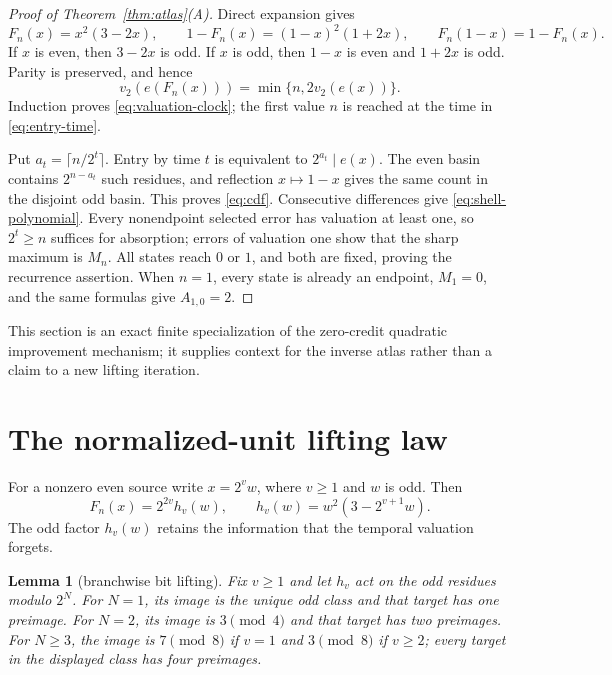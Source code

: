 \documentclass[a4paper,10pt]{amsart}
\newtheorem{lemma}[theorem]{Lemma}
\theoremstyle{remark}
\newcommand{\vtwo}{v_2}
\begin{document}
\begin{proof}[Proof of Theorem~\ref{thm:atlas}(A)]
Direct expansion gives
\begin{equation}\label{eq:factorizations}
 F_n(x)=x^2(3-2x),\qquad
 1-F_n(x)=(1-x)^2(1+2x),\qquad
 F_n(1-x)=1-F_n(x).
\end{equation}
If $x$ is even, then $3-2x$ is odd.  If $x$ is odd, then $1-x$ is even
and $1+2x$ is odd.  Parity is preserved, and hence
\[
 \vtwo(e(F_n(x)))=\min\{n,2\vtwo(e(x))\}.
\]
Induction proves \eqref{eq:valuation-clock}; the first value $n$ is reached
at the time in \eqref{eq:entry-time}.

Put $a_t=\lceil n/2^t\rceil$.  Entry by time $t$ is equivalent to
$2^{a_t}\mid e(x)$.  The even basin contains $2^{n-a_t}$ such residues,
and reflection $x\mapsto1-x$ gives the same count in the disjoint odd basin.
This proves \eqref{eq:cdf}.  Consecutive differences give
\eqref{eq:shell-polynomial}.  Every nonendpoint selected error has valuation
at least one, so $2^t\geq n$ suffices for absorption; errors of valuation one
show that the sharp maximum is $M_n$.  All states reach $0$ or $1$, and both
are fixed, proving the recurrence assertion.  When $n=1$, every state is
already an endpoint, $M_1=0$, and the same formulas give $A_{1,0}=2$.
\end{proof}

This section is an exact finite specialization of the zero-credit quadratic
improvement mechanism; it supplies context for the inverse atlas rather than
a claim to a new lifting iteration.

\section{The normalized-unit lifting law}\label{sec:lifting}

For a nonzero even source write $x=2^v w$, where $v\geq1$ and $w$ is odd.
Then
\begin{equation}\label{eq:hv-factor}
 F_n(x)=2^{2v}h_v(w),\qquad
 h_v(w)=w^2(3-2^{v+1}w).
\end{equation}
The odd factor $h_v(w)$ retains the information that the temporal valuation
forgets.

\begin{lemma}[branchwise bit lifting]\label{lem:unit}
Fix $v\geq1$ and let $h_v$ act on the odd residues modulo $2^N$.
For $N=1$, its image is the unique odd class and that target has one
preimage.  For $N=2$, its image is $3\pmod4$ and that target has two
preimages.  For $N\geq3$, the image is $7\pmod8$ if $v=1$ and
$3\pmod8$ if $v\geq2$; every target in the displayed class has four
preimages.
\end{lemma}
\end{document}
